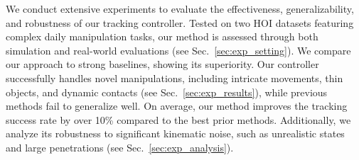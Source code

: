 We conduct extensive experiments to evaluate the effectiveness, generalizability, and robustness of our tracking controller. Tested on two HOI datasets featuring complex daily manipulation tasks, our method is assessed through both simulation and real-world evaluations (see Sec.~\ref{sec:exp_setting}). We compare our approach to strong baselines, showing its superiority. Our controller successfully handles novel manipulations, including intricate movements, thin objects, and dynamic contacts (see Sec.~\ref{sec:exp_results}), while previous methods fail to generalize well. On average, our method improves the tracking success rate by over 10\% compared to the best prior methods. Additionally, we analyze its robustness to significant kinematic noise, such as unrealistic states and large penetrations (see Sec.~\ref{sec:exp_analysis}).







